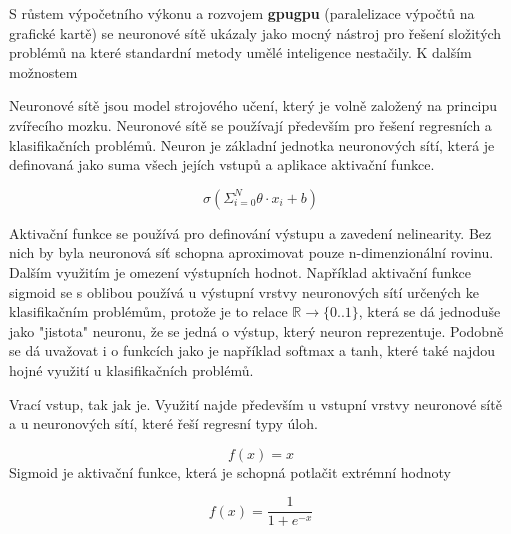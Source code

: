 S růstem výpočetního výkonu a rozvojem \textbf{gpugpu} (paralelizace výpočtů na grafické kartě) se neuronové sítě ukázaly jako mocný nástroj pro řešení složitých problémů na které standardní metody umělé inteligence nestačily.
K dalším možnostem 



Neuronové sítě jsou model strojového učení, který je volně založený na principu zvířecího mozku.  \cite[s.~41]{fundementalsOfDeepLearning}
Neuronové sítě se používají především pro řešení regresních a klasifikačních problémů.
Neuron je základní jednotka neuronových sítí, která je definovaná jako suma všech jejích vstupů a aplikace aktivační funkce.

	$$\sigma(\Sigma_{i=0}^{N} \theta \cdot x_{i} + b)$$

Aktivační funkce se používá pro definování výstupu a zavedení nelinearity. Bez nich by byla neuronová síť schopna aproximovat pouze n-dimenzionální rovinu. \cite[s.~65]{fundementalsOfDeepLearning} \\
Dalším využitím je omezení výstupních hodnot. Například aktivační funkce sigmoid se s oblibou používá u výstupní vrstvy neuronových sítí určených ke klasifikačním problémům, protože je to relace $\mathbb{R} \rightarrow \{0..1\}$, která se dá jednoduše jako "jistota" neuronu, že se jedná o výstup, který neuron reprezentuje. Podobně se dá uvažovat i o funkcích jako je například softmax a tanh, které také najdou hojné využití u klasifikačních problémů.

Vrací vstup, tak jak je. Využití najde především u vstupní vrstvy neuronové sítě a u neuronových sítí, které řeší regresní typy úloh.
\\
$$f(x) = x$$
Sigmoid je aktivační funkce, která je schopná potlačit extrémní hodnoty 

$$f(x) = \frac{1}{1 + e^{-x}}$$

